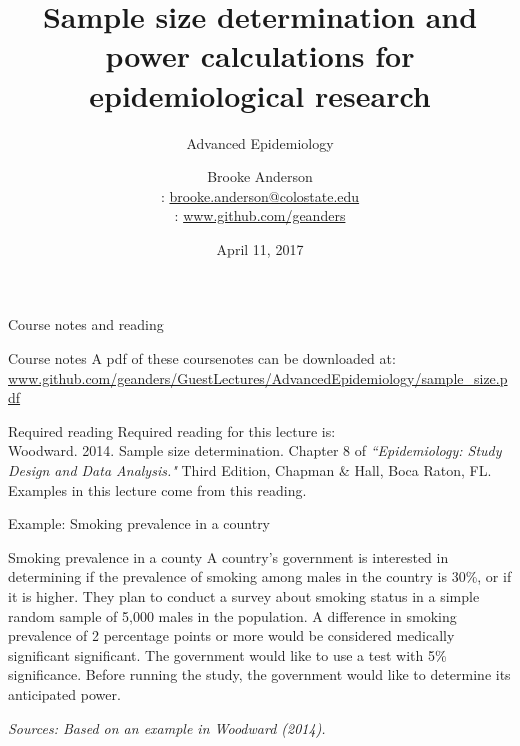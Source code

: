 \documentclass[ignorenonframetext,]{beamer}
\title[Sample size determination / Power calculations]{Sample size determination and power calculations for epidemiological research}
\subtitle{Advanced Epidemiology}
\date{April 11, 2017}
\author[Brooke Anderson]{
  Brooke Anderson \\\medskip
  {\small \faEnvelope: \url{brooke.anderson@colostate.edu}} \\
  {\small \faGithub:  \url{www.github.com/geanders}}}
\institute[Colorado State University]{
  Department of Environmental \& Radiological Health Sciences \\
  Environmental Epidemiology Section \\
  Colorado State University}
\date{}
\begin{document}
\begin{frame}
  \titlepage
\end{frame}

\begin{frame}{Course notes and reading}

\begin{block}{Course notes}
A pdf of these coursenotes can be downloaded at: \\ \medskip
\url{www.github.com/geanders/GuestLectures/AdvancedEpidemiology/sample_size.pdf}
\end{block}

\begin{block}{Required reading}
Required reading for this lecture is: \\ \medskip
Woodward. 2014. Sample size determination. Chapter 8 of \textit{``Epidemiology: Study Design and Data Analysis."} Third Edition, Chapman \& Hall, Boca Raton, FL. \\ \medskip
Examples in this lecture come from this reading. 
\end{block}

\end{frame}

\begin{frame}{Example: Smoking prevalence in a country}

\begin{block}{Smoking prevalence in a county}
A country's government is interested in determining if the prevalence of smoking among males in the country is 30\%, or if it is higher. They plan to conduct a survey about smoking status in a simple random sample of 5,000 males in the population. A difference in smoking prevalence of 2 percentage points or more would be considered medically significant significant. The government would like to use a test with 5\% significance. Before running the study, the government would like to determine its anticipated power.
\end{block}

\footnotesize{\textit{Sources: Based on an example in Woodward (2014).}}

\end{frame}
\end{document}
